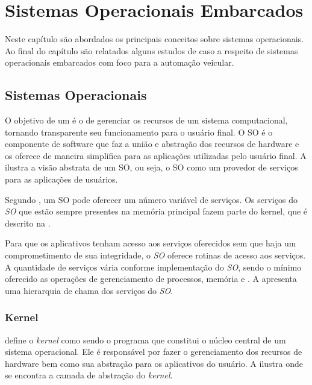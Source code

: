 \chapter{Sistemas Operacionais Embarcados}

Neste capítulo são abordados os principais conceitos sobre sistemas operacionais. Ao final do capítulo são relatados alguns estudos de caso a respeito de sistemas operacionais embarcados com foco para a automação veicular.

\section{Sistemas Operacionais}

O objetivo de um  é o de gerenciar os recursos de um sistema computacional, tornando transparente seu funcionamento para o usuário final. O SO é o componente de software que faz a união e abstração dos recursos de hardware e os oferece de maneira simplifica para as aplicações utilizadas pelo usuário final. A  ilustra a visão abstrata de um SO, ou seja, o SO como um provedor de serviços para as aplicações de usuários.


Segundo , um SO pode oferecer um número variável de serviços. Os serviços do \emph{SO} que estão sempre presentes na memória principal fazem parte do kernel, que é descrito na . 

Para que os aplicativos tenham acesso aos serviços oferecidos sem que haja um comprometimento de sua integridade, o \emph{SO} oferece rotinas de acesso aos serviços. A quantidade de serviços vária conforme implementação do \emph{SO}, sendo o mínimo oferecido as operações de gerenciamento de processos, memória e . A  apresenta uma hierarquia de chama dos serviços do \emph{SO}.


\subsection{Kernel}
\label{cap:os_kernel}

 define o \emph{kernel} como sendo o programa que constitui o núcleo central de um sistema operacional. Ele é responsável por fazer o gerenciamento dos recursos de hardware bem como sua abstração para os aplicativos do usuário. A  ilustra onde se encontra a camada de abstração do \emph{kernel}.

